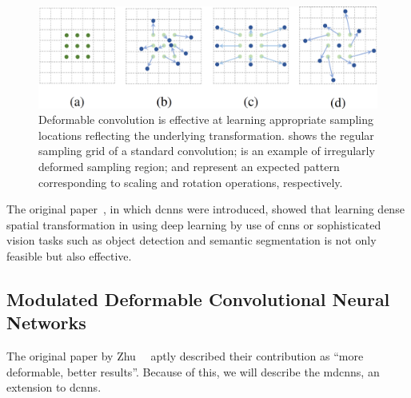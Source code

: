 \begin{figure}[t]
    \centerline{\includegraphics[width=0.7\linewidth]{figures/siamese_tracking/dcn_sampling_locations.png}}
    \caption[Various sampling locations in \glspl{dcnn}]{Deformable convolution is effective at learning appropriate sampling locations reflecting the underlying transformation.  shows the regular sampling grid of a standard convolution;  is an example of irregularly deformed sampling region;  and  represent an expected pattern corresponding to scaling and rotation operations, respectively. }
    \label{fig:SamplingLocationsDeformableCNN}
\end{figure}

The original paper~\cite{dai2017dcnn}, in which \glspl{dcnn} were introduced, showed that learning dense spatial transformation in using deep learning by use of \glspl{cnn} or sophisticated vision tasks such as object detection and semantic segmentation is not only feasible but also effective.

\subsection{Modulated Deformable Convolutional Neural Networks}
\label{ssec:ModulatedDeformableCNNs}

The original paper by Zhu~\etal{}~\cite{zhu2018mdcnn} aptly described their contribution as ``more deformable, better results''. Because of this, we will describe the \glspl{mdcnn}, an extension to \glspl{dcnn}.

